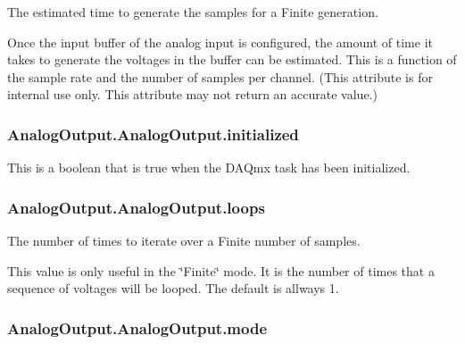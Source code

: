 The estimated time to generate the samples for a Finite generation. 

Once the input buffer of the analog input is configured, the amount of time it takes to generate the voltages in the buffer can be estimated. This is a function of the sample rate and the number of samples per channel. (This attribute is for internal use only. This attribute may not return an accurate value.) \hypertarget{class_analog_output_1_1_analog_output_aff699a66c410a728e70631b2e5e621a2}{
\subsubsection[{initialized}]{\setlength{\rightskip}{0pt plus 5cm}Analog\-Output.\-Analog\-Output.\-initialized}}\label{class_analog_output_1_1_analog_output_aff699a66c410a728e70631b2e5e621a2}


This is a boolean that is true when the D\-A\-Qmx task has been initialized. 

\hypertarget{class_analog_output_1_1_analog_output_a6ef94f02074244f9f6c513fd25208b46}{
\subsubsection[{loops}]{\setlength{\rightskip}{0pt plus 5cm}Analog\-Output.\-Analog\-Output.\-loops}}\label{class_analog_output_1_1_analog_output_a6ef94f02074244f9f6c513fd25208b46}


The number of times to iterate over a Finite number of samples. 

This value is only useful in the \char`\"{}\-Finite\char`\"{} mode. It is the number of times that a sequence of voltages will be looped. The default is allways 1. \hypertarget{class_analog_output_1_1_analog_output_aac2f3b8aa6e295ee91e3671c57c68e47}{
\subsubsection[{mode}]{\setlength{\rightskip}{0pt plus 5cm}Analog\-Output.\-Analog\-Output.\-mode}}\label{class_analog_output_1_1_analog_output_aac2f3b8aa6e295ee91e3671c57c68e47}


